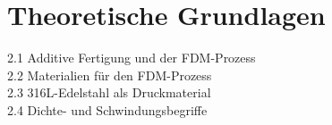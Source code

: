 \chapter{Theoretische Grundlagen}

2.1 Additive Fertigung und der FDM-Prozess\\
2.2 Materialien für den FDM-Prozess\\
2.3 316L-Edelstahl als Druckmaterial\\
2.4 Dichte- und Schwindungsbegriffe\\